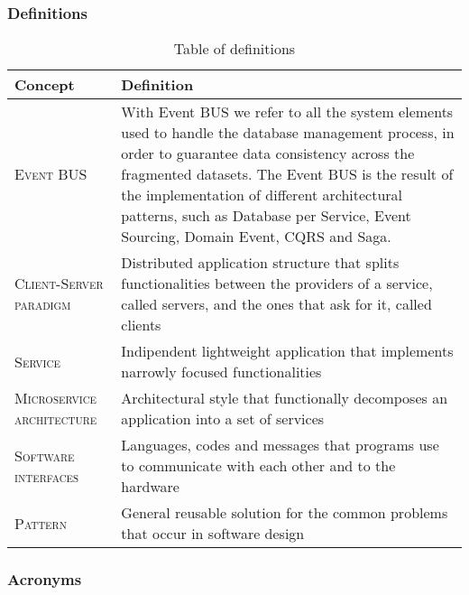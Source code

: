 \subsubsection{Definitions}
\label{sec:definitions}
\begin{table}[H]
    \setlength\arrayrulewidth{1pt}
    \centering
    \begin{tabular}{|m{}|m{}|}
        \rowcolor{myblue}
        \hline
        \color{white}Concept & \color{white}Definition \\
        \hline
        \textsc{Event BUS}     &    With Event BUS we refer to all the system elements used to handle the database management process, in order to guarantee data consistency across the fragmented datasets. The Event BUS is the result of the implementation of different architectural patterns, such as Database per Service, Event Sourcing, Domain Event, CQRS and Saga. \\
        \hline
        \textsc{Client-Server paradigm}     &    Distributed application structure that splits functionalities between the providers of a service, called servers, and the ones that ask for it, called clients \\
        \hline
        \textsc{Service}     &    Indipendent lightweight application that implements narrowly focused functionalities\\
        \hline
        \textsc{Microservice architecture}     &    Architectural style that functionally decomposes an application into a set of services\\
        \hline
        \textsc{Software interfaces}     &    Languages, codes and messages that programs use to communicate with each other and to the hardware\\
        \hline
        \textsc{Pattern}     &    General reusable solution for the common problems that occur in software design\\
        \hline
    \end{tabular}
    
    \caption{\label{tab:def}Table of definitions}
    
\end{table}

\subsubsection{Acronyms}
\label{sec:acronyms}

